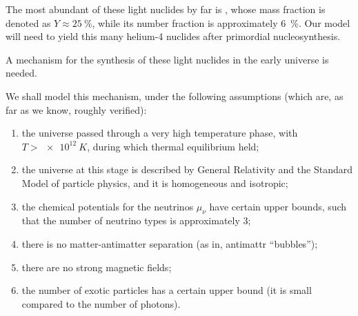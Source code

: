 \documentclass[main.tex]{subfiles}
\begin{document}
The most abundant of these light nuclides by far is , whose mass fraction is denoted as \(Y \approx \SI{25}{\percent}\), while its number fraction is approximately \SI{6}{\percent}. Our model will need to yield this many helium-4 nuclides after primordial nucleosynthesis. 

A mechanism for the synthesis of these light nuclides in the early universe is needed. 

We shall model this mechanism, under the following assumptions (which are, as far as we know, roughly verified):
%
\begin{enumerate}
    \item the universe passed through a very high temperature phase, with \(T > \SI{e12}{K}\), during which thermal equilibrium held;
    \item the universe at this stage is described by General Relativity and the Standard Model of particle physics, and it is homogeneous and isotropic;
    \item the chemical potentials for the neutrinos \(\mu_{\nu }\) have certain upper bounds, such that the number of neutrino types is approximately 3; 
    \item there is no matter-antimatter separation (as in, antimattr ``bubbles'');
    \item there are no strong magnetic fields;
    \item the number of exotic particles has a certain upper bound (it is small compared to the number of photons).
\end{enumerate}



%

\end{document}
